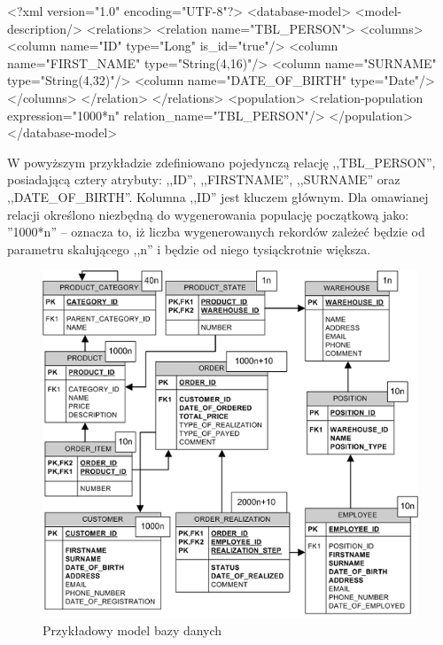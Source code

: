 \begin{codeblock}
<?xml version="1.0" encoding="UTF-8"?>
<database-model>
    <model-description/>
    <relations>
        <relation name="TBL_PERSON">
            <columns>
                <column name="ID" type="Long" is_id="true"/>
                <column name="FIRST_NAME" type="String(4,16)"/>
                <column name="SURNAME" type="String(4,32)"/>
                <column name="DATE_OF_BIRTH" type="Date"/>
            </columns>
        </relation>
    </relations>
    <population>
        <relation-population expression="1000*n" relation_name="TBL_PERSON"/>
    </population>
</database-model>
\end{codeblock}

W powyższym przykładzie zdefiniowano pojedynczą relację ,,TBL\_PERSON'', posiadającą
cztery atrybuty: ,,ID'', ,,FIRSTNAME'', ,,SURNAME'' oraz ,,DATE\_OF\_BIRTH''. Kolumna
,,ID'' jest kluczem głównym. Dla omawianej relacji określono niezbędną do wygenerowania 
populację początkową jako: ''1000*n'' -- oznacza to, iż liczba wygenerowanych rekordów
zależeć będzie od parametru skalującego ,,n'' i będzie od niego tysiąckrotnie większa.

\begin{figure}[h]
\begin{center}
\includegraphics[width=0.9\linewidth]{figures/database-model.png}
\end{center}
\caption{Przykładowy model bazy danych}\label{rys:database-model}
\end{figure}

